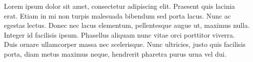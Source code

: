 \begin{acknowledgements}
    Lorem ipsum dolor sit amet, consectetur adipiscing elit. Praesent quis lacinia erat. Etiam in mi non turpis malesuada bibendum sed porta lacus. Nunc ac egestas lectus. Donec nec lacus elementum, pellentesque augue ut, maximus nulla. Integer id facilisis ipsum. Phasellus aliquam nunc vitae orci porttitor viverra. Duis ornare ullamcorper massa nec scelerisque. Nunc ultricies, justo quis facilisis porta, diam metus maximus neque, hendrerit pharetra purus urna vel dui.
\end{acknowledgements}